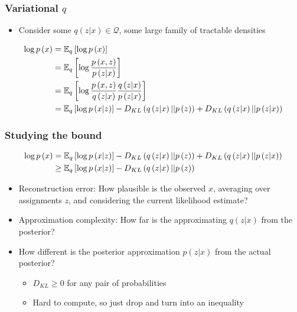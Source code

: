 \documentclass[10pt,mathserif]{beamer}
\begin{document}
\begin{frame}
  \frametitle{Variational $q$}
  \begin{itemize}
  \item Consider some $q\left(z \vert x\right) \in \mathcal{Q}$, some large
    family of tractable densities
  \end{itemize} 
  \begin{align*}
    \log p\left(x\right) &= \mathbb{E}_{q}\left[{\log p\left(x\right)}\right] \\
    &= \mathbb{E}_{q}\left[{\log \frac{p\left(x, z\right)}{p\left(z \vert x\right)}}\right] \\
    &= \mathbb{E}_{q}\left[{\log \frac{p\left(x, z\right)}{q\left(z \vert x\right)} \frac{q\left(z \vert x\right)}{p\left(z \vert x\right)}}\right] \\
    &= \mathbb{E}_{q}\left[{\log p\left(x \vert z\right)}\right] - D_{KL}\left(q\left(z \vert x\right) \vert \vert p\left(z\right)\right) + D_{KL}\left(q\left(z \vert x\right) \vert \vert p\left(z \vert x\right)\right)
  \end{align*}
\end{frame}

\begin{frame}
  \frametitle{Studying the bound}
  \begin{align*}
    \log p\left(x\right) &= \mathbb{E}_{q}\left[{\log p\left(x \vert z\right)}\right] - D_{KL}\left(q\left(z \vert x\right) \vert \vert p\left(z\right)\right) + D_{KL}\left(q\left(z \vert x\right) \vert \vert p\left(z \vert x\right)\right) \\
     &\geq \mathbb{E}_{q}\left[{\log p\left(x \vert z\right)}\right] - D_{KL}\left(q\left(z \vert x\right) \vert \vert p\left(z\right)\right)
  \end{align*}
  \begin{itemize}
  \item Reconstruction error: How plausible is the observed $x$, averaging over
    assignments $z$, and considering the current likelihood estimate?
  \item Approximation complexity: How far is the approximating $q\left(z \vert
    x\right)$ from the posterior?
  \item How different is the posterior approximation $p\left(z \vert x\right)$
    from the actual posterior?
    \begin{itemize}
    \item $D_{KL} \geq 0$ for any pair of probabilities
    \item Hard to compute, so just drop and turn into an inequality
    \end{itemize}
  \end{itemize}
\end{frame}
\end{document}
